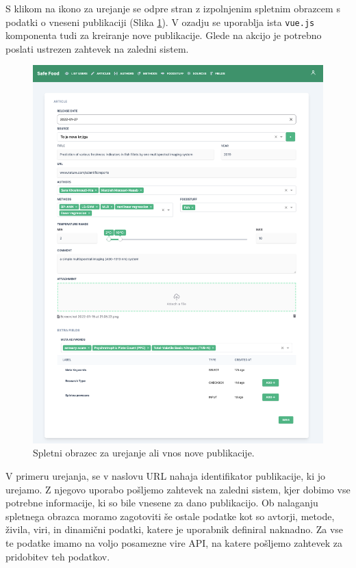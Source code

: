 \documentclass[a4paper, 12pt]{book}
\begin{document}
S klikom na ikono za urejanje se odpre stran z izpolnjenim spletnim obrazcem s podatki o vneseni publikaciji (Slika \ref{edit-articles}). V ozadju se uporablja ista \verb=vue.js= komponenta tudi za kreiranje nove publikacije. Glede na akcijo je potrebno poslati ustrezen zahtevek na zaledni sistem.

\begin{figure}[h]
\begin{center}
\includegraphics[width=1\textwidth]{slike/form-create-article.png}
\end{center}
\caption{ Spletni obrazec za urejanje ali vnos nove publikacije. }
\label{edit-articles}
\end{figure}

V primeru urejanja, se v naslovu URL nahaja identifikator publikacije, ki jo urejamo. Z njegovo uporabo pošljemo zahtevek na zaledni sistem, kjer dobimo vse potrebne informacije, ki so bile vnesene za dano publikacijo. Ob nalaganju spletnega obrazca moramo zagotoviti še ostale podatke kot so avtorji, metode, živila, viri, in dinamični podatki, katere je uporabnik definiral naknadno. Za vse te podatke imamo na voljo posamezne vire API, na katere pošljemo zahtevek za pridobitev teh podatkov. 
\end{document}
